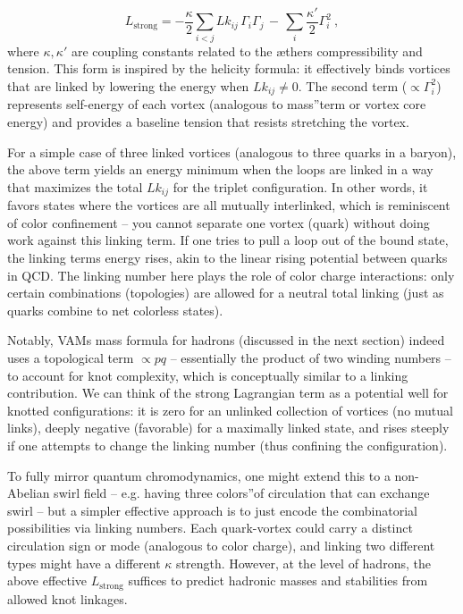 \[
    L_{\text{strong}} = -\frac{\kappa}{2}\sum_{i<j} Lk_{ij}\,\Gamma_i \Gamma_j \,-\, \sum_i \frac{\kappa'}{2} \Gamma_i^2~,
\]
where $\kappa, \kappa'$ are coupling constants related to the æther\rqs s compressibility and tension. This form is inspired by the helicity formula: it effectively binds vortices that are linked by lowering the energy when $Lk_{ij} \neq 0$. The second term ($\propto \Gamma_i^2$) represents self-energy of each vortex (analogous to \grqq mass\textquotedblright term or vortex core energy) and provides a baseline tension that resists stretching the vortex.


For a simple case of three linked vortices (analogous to three quarks in a baryon), the above term yields an energy minimum when the loops are linked in a way that maximizes the total $Lk_{ij}$ for the triplet configuration. In other words, it favors states where the vortices are all mutually interlinked, which is reminiscent of color confinement – you cannot separate one vortex (quark) without doing work against this linking term. If one tries to pull a loop out of the bound state, the linking term\rqs s energy rises, akin to the linear rising potential between quarks in QCD. The linking number here plays the role of color charge interactions: only certain combinations (topologies) are allowed for a neutral total linking (just as quarks combine to net colorless states).


Notably, VAM\rqs s mass formula for hadrons (discussed in the next section) indeed uses a topological term $\propto p q$ – essentially the product of two winding numbers – to account for knot complexity, which is conceptually similar to a linking contribution. We can think of the strong Lagrangian term as a potential well for knotted configurations: it is zero for an unlinked collection of vortices (no mutual links), deeply negative (favorable) for a maximally linked state, and rises steeply if one attempts to change the linking number (thus confining the configuration).


To fully mirror quantum chromodynamics, one might extend this to a non-Abelian swirl field – e.g. having three \grqq colors\textquotedblright of circulation that can exchange swirl – but a simpler effective approach is to just encode the combinatorial possibilities via linking numbers. Each quark-vortex could carry a distinct circulation sign or mode (analogous to color charge), and linking two different types might have a different $\kappa$ strength. However, at the level of hadrons, the above effective $L_{\text{strong}}$ suffices to predict hadronic masses and stabilities from allowed knot linkages.


